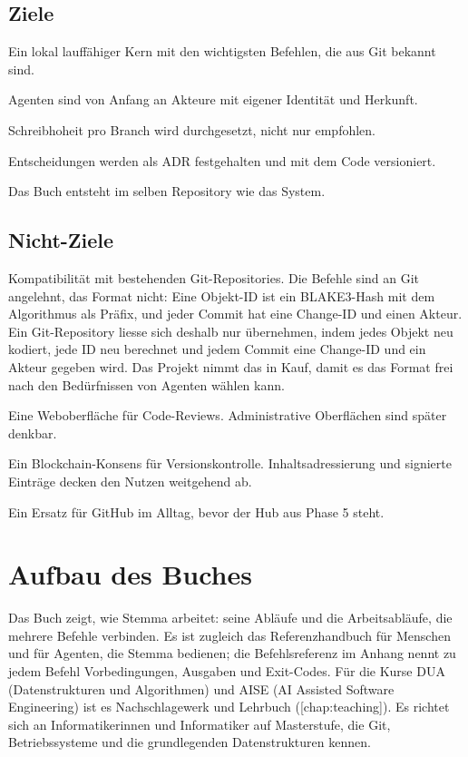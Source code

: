 \subsection{Ziele}

\startitemize
\item Ein lokal lauffähiger Kern mit den wichtigsten Befehlen, die aus Git bekannt sind.
\item Agenten sind von Anfang an Akteure mit eigener Identität und Herkunft.
\item Schreibhoheit pro Branch wird durchgesetzt, nicht nur empfohlen.
\item Entscheidungen werden als ADR festgehalten und mit dem Code versioniert.
\item Das Buch entsteht im selben Repository wie das System.
\stopitemize

\subsection{Nicht-Ziele}

\startitemize
\item Kompatibilität mit bestehenden Git-Repositories.
Die Befehle sind an Git angelehnt, das Format nicht:
Eine Objekt-ID ist ein BLAKE3-Hash mit dem Algorithmus als Präfix,
und jeder Commit hat eine Change-ID und einen Akteur.
Ein Git-Repository liesse sich deshalb nur übernehmen,
indem jedes Objekt neu kodiert, jede ID neu berechnet
und jedem Commit eine Change-ID und ein Akteur gegeben wird.
Das Projekt nimmt das in Kauf, damit es das Format frei nach den Bedürfnissen von Agenten
wählen kann.
\item Eine Weboberfläche für Code-Reviews. Administrative Oberflächen sind später denkbar.
\item Ein Blockchain-Konsens für Versionskontrolle. Inhaltsadressierung und signierte Einträge
decken den Nutzen weitgehend ab.
\item Ein Ersatz für GitHub im Alltag, bevor der Hub aus Phase 5 steht.
\stopitemize

\section{Aufbau des Buches}

Das Buch zeigt, wie Stemma arbeitet: seine Abläufe und die Arbeitsabläufe,
die mehrere Befehle verbinden.
Es ist zugleich das Referenzhandbuch für Menschen und für Agenten, die Stemma bedienen;
die Befehlsreferenz im Anhang nennt zu jedem Befehl Vorbedingungen, Ausgaben und Exit-Codes.
Für die Kurse DUA (Datenstrukturen und Algorithmen) und AISE (AI Assisted Software
Engineering) ist es Nachschlagewerk und Lehrbuch ([chap:teaching]).
Es richtet sich an Informatikerinnen und Informatiker auf Masterstufe,
die Git, Betriebssysteme und die grundlegenden Datenstrukturen kennen.

